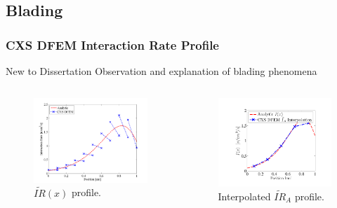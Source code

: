 \documentclass{beamer}
\begin{document}
\subsection{Blading}
\begin{frame}
\frametitle{CXS DFEM Interaction Rate Profile}

\begin{block}{New to Dissertation}
Observation and explanation of blading phenomena
\end{block}
\begin{columns}[c]
\begin{figure}
\includegraphics[width=5cm]{../chapter3_variable_xs/CXS_I_Profile.png}
\caption{$\widetilde{IR}(x)$ profile.}
\end{figure}
\begin{figure}
\includegraphics[width=5cm]{../chapter3_variable_xs/CXS_I_A_Profile.pdf}
\caption{Interpolated $\widetilde{IR}_A$ profile.}
\end{figure}
\end{columns}

\end{frame}
\end{document}
